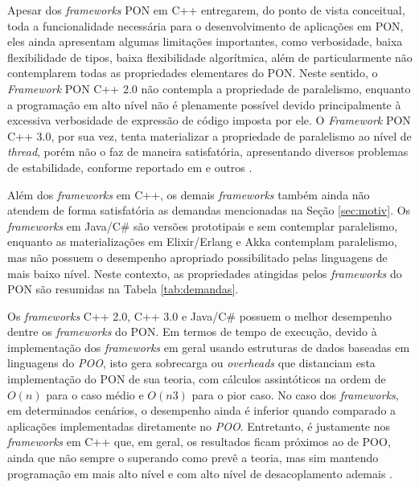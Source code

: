 Apesar dos \textit{frameworks} PON em C++ entregarem, do ponto de vista
conceitual, toda a funcionalidade necessária para o desenvolvimento de
aplicações em PON, eles ainda apresentam algumas limitações importantes, como
verbosidade, baixa flexibilidade de tipos, baixa flexibilidade algorítmica, além
de particularmente não contemplarem todas as propriedades elementares do PON.
Neste sentido, o \textit{Framework} PON C++ 2.0 não contempla a propriedade de
paralelismo, enquanto a programação em alto nível não é plenamente possível
devido principalmente à excessiva verbosidade de expressão de código imposta por
ele. O \textit{Framework} PON C++ 3.0, por sua vez, tenta materializar a
propriedade de paralelismo ao nível de \textit{thread}, porém não o faz de
maneira satisfatória, apresentando diversos problemas de estabilidade, conforme
reportado em  e outros
\cite{martini_2019,doc_ronszcka_2019,msc_negrini_2019}.

Além dos \textit{frameworks} em C++, os demais \textit{frameworks} também ainda
não atendem de forma satisfatória as demandas mencionadas na Seção
\ref{sec:motiv}. Os \textit{frameworks} em Java/C\# são versões prototipais e
sem contemplar paralelismo, enquanto as materializações em Elixir/Erlang e Akka
contemplam paralelismo, mas não possuem o desempenho apropriado possibilitado
pelas linguagens de mais baixo nível. Neste contexto, as propriedades atingidas
pelos \textit{frameworks} do PON são resumidas na Tabela \ref{tab:demandas}.

Os \textit{frameworks} C++ 2.0, C++ 3.0 e Java/C\# possuem o melhor desempenho
dentre os \textit{frameworks} do PON. Em termos de tempo de execução, devido à
implementação dos \textit{frameworks} em geral usando estruturas de dados
baseadas em linguagens do \textit{POO}, isto gera sobrecarga ou
\textit{overheads} que distanciam esta implementação do PON de sua teoria, com
cálculos assintóticos na ordem de \(O(n)\) para o caso médio e \(O(n3)\) para o
pior caso. No caso dos \textit{frameworks}, em determinados cenários, o
desempenho ainda é inferior quando comparado a aplicações implementadas
diretamente no \textit{POO}. Entretanto, é justamente nos \textit{frameworks} em
C++ que, em geral, os resultados ficam próximos ao de POO, ainda que não sempre
o superando como prevê a teoria, mas sim mantendo programação em mais alto nível
e com alto nível de desacoplamento ademais
\cite{msc_Banaszewski_2009,msc_valenca_2012}.

